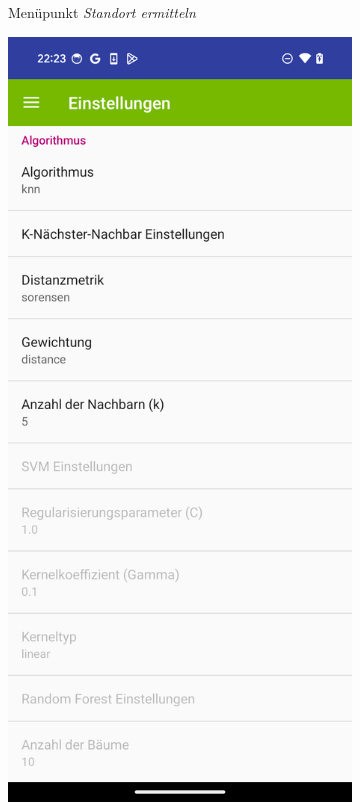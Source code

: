 \begin{figure}[h!]
\begin{subfigure}[b]{0.3\textwidth}
        \caption{Menüpunkt \textit{Standort ermitteln}}
        \label{fig:app-localize-1}
    \end{subfigure}
    \hfill
    \begin{subfigure}[b]{0.3\textwidth}
        \centering
        \includegraphics[width=\textwidth]{images/screenshots/settings_1.png}

\end{subfigure}
\end{figure}
